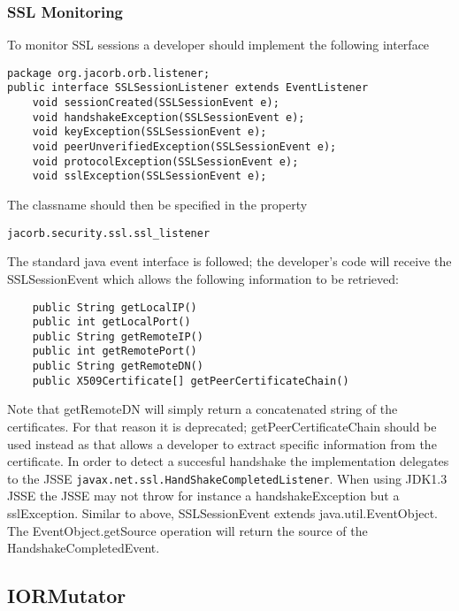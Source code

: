 \subsubsection{SSL Monitoring}

To monitor SSL sessions a developer should implement the following interface
\begin{small}
\begin{verbatim}
package org.jacorb.orb.listener;
public interface SSLSessionListener extends EventListener
    void sessionCreated(SSLSessionEvent e);
    void handshakeException(SSLSessionEvent e);
    void keyException(SSLSessionEvent e);
    void peerUnverifiedException(SSLSessionEvent e);
    void protocolException(SSLSessionEvent e);
    void sslException(SSLSessionEvent e);
\end{verbatim}
\end{small}
The classname should then be specified in the property
\begin{verbatim}
jacorb.security.ssl.ssl_listener
\end{verbatim}

The standard java event interface is followed; the developer's code will receive the
SSLSessionEvent which allows the following information to be retrieved:
\begin{small}
\begin{verbatim}
    public String getLocalIP()
    public int getLocalPort()
    public String getRemoteIP()
    public int getRemotePort()
    public String getRemoteDN()
    public X509Certificate[] getPeerCertificateChain()
\end{verbatim}
\end{small}

Note that getRemoteDN will simply return a concatenated string of the
certificates. For that reason it is deprecated; getPeerCertificateChain should
be used instead as that allows a developer to extract specific information from
the certificate.  In order to detect a succesful handshake the implementation
delegates to the JSSE {\tt javax.net.ssl.HandShakeCompletedListener}. When using
JDK1.3 JSSE the JSSE may not throw for instance a handshakeException but a
sslException. Similar to above, SSLSessionEvent extends java.util.EventObject. The
EventObject.getSource operation will return the source of the HandshakeCompletedEvent.

\subsection{IORMutator}
\label{iorMutator}

